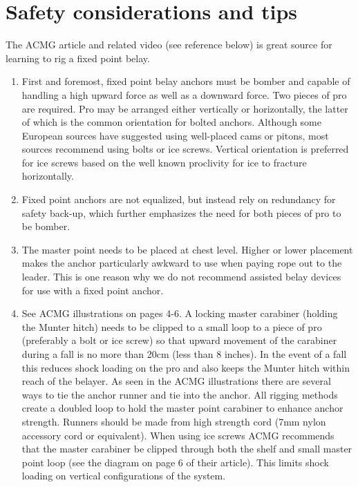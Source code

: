 \documentclass[nonacm,acmtog]{acmart}
\begin{document}
\section{Safety considerations and tips}
The ACMG article and related video (see reference below) is great source for
learning to rig a fixed point belay.

\begin{enumerate}
\item First and foremost, fixed point belay anchors must be bomber and capable
of handling a high upward force as well as a downward force. Two pieces of pro
are required. Pro may be arranged either vertically or horizontally, the latter
of which is the common orientation for bolted anchors. Although some European
sources have suggested using well-placed cams or pitons, most sources recommend
using bolts or ice screws. Vertical orientation is preferred for ice screws
based on the well known proclivity for ice to fracture horizontally.

\item  Fixed point anchors are not equalized, but instead rely on redundancy
for safety back-up, which further emphasizes the need for both pieces of pro to
be bomber.

\item The master point needs to be placed at chest level. Higher or lower
placement makes the anchor particularly awkward to use when paying rope out to
the leader. This is one reason why we do not recommend assisted belay devices
for use with a fixed point anchor.

\item See ACMG illustrations on pages 4-6.  A locking master carabiner (holding
the Munter hitch) needs to be clipped to a small loop to a piece of pro
(preferably a bolt or ice screw) so that upward movement of the carabiner
during a fall is no more than 20cm (less than 8 inches). In the event of a fall
this reduces shock loading on the pro and also keeps the Munter hitch within
reach of the belayer. As seen in the ACMG illustrations there are several ways
to tie the anchor runner and tie into the anchor. All rigging methods create a
doubled loop to hold the master point carabiner to enhance anchor strength.
Runners should be made from high strength cord (7mm nylon accessory cord or
equivalent). When using ice screws ACMG recommends that the master carabiner be
clipped through both the shelf and small master point loop (see the diagram on
page  6 of their article). This limits shock loading on vertical configurations
of the system.


\end{enumerate}
\end{document}
